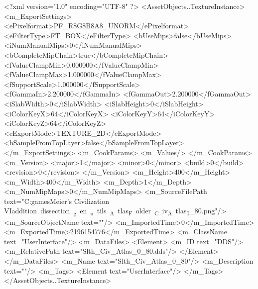 <?xml version="1.0" encoding="UTF-8" ?>
<AssetObjects..TextureInstance>
	<m_ExportSettings>
		<ePixelformat>PF_R8G8B8A8_UNORM</ePixelformat>
		<eFilterType>FT_BOX</eFilterType>
		<bUseMips>false</bUseMips>
		<iNumManualMips>0</iNumManualMips>
		<bCompleteMipChain>true</bCompleteMipChain>
		<fValueClampMin>0.000000</fValueClampMin>
		<fValueClampMax>1.000000</fValueClampMax>
		<fSupportScale>1.000000</fSupportScale>
		<fGammaIn>2.200000</fGammaIn>
		<fGammaOut>2.200000</fGammaOut>
		<iSlabWidth>0</iSlabWidth>
		<iSlabHeight>0</iSlabHeight>
		<iColorKeyX>64</iColorKeyX>
		<iColorKeyY>64</iColorKeyY>
		<iColorKeyZ>64</iColorKeyZ>
		<eExportMode>TEXTURE_2D</eExportMode>
		<bSampleFromTopLayer>false</bSampleFromTopLayer>
	</m_ExportSettings>
	<m_CookParams>
		<m_Values/>
	</m_CookParams>
	<m_Version>
		<major>1</major>
		<minor>0</minor>
		<build>0</build>
		<revision>0</revision>
	</m_Version>
	<m_Height>400</m_Height>
	<m_Width>400</m_Width>
	<m_Depth>1</m_Depth>
	<m_NumMipMaps>0</m_NumMipMaps>
	<m_SourceFilePath text="C:\Users\Sam\Documents\my games\Sid Meier's Civilization VI\Mods\unit addition dissection\python_gen\build_utils\CIV_Atlas_Folder\Slth_Civ_Atlas_0_80.png"/>
	<m_SourceObjectName text=""/>
	<m_ImportedTime>0</m_ImportedTime>
	<m_ExportedTime>2196154776</m_ExportedTime>
	<m_ClassName text="UserInterface"/>
	<m_DataFiles>
		<Element>
			<m_ID text="DDS"/>
			<m_RelativePath text="Slth_Civ_Atlas_0_80.dds"/>
		</Element>
	</m_DataFiles>
	<m_Name text="Slth_Civ_Atlas_0_80"/>
	<m_Description text=""/>
	<m_Tags>
		<Element text="UserInterface"/>
	</m_Tags>
</AssetObjects..TextureInstance>

